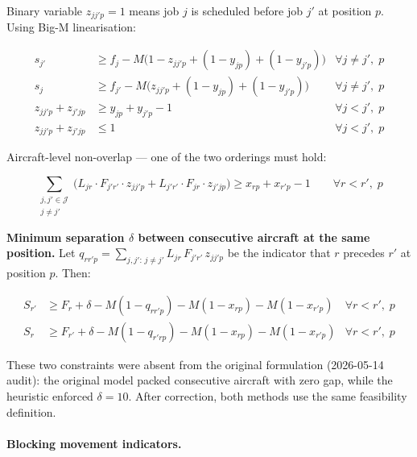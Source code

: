 Binary variable $z_{jj'p} = 1$ means job $j$ is scheduled before job $j'$ at
position $p$.  Using Big-M linearisation:

\begin{align}
    s_{j'} &\geq f_j - M\bigl(1 - z_{jj'p} + (1-y_{jp}) + (1-y_{j'p})\bigr)
        & \forall j \neq j',\; p
        \label{eq:non-overlap-1} \\
    s_j &\geq f_{j'} - M\bigl(z_{jj'p} + (1-y_{jp}) + (1-y_{j'p})\bigr)
        & \forall j \neq j',\; p
        \label{eq:non-overlap-2} \\
    z_{jj'p} + z_{j'jp} &\geq y_{jp} + y_{j'p} - 1
        & \forall j < j',\; p
        \label{eq:order-lb} \\
    z_{jj'p} + z_{j'jp} &\leq 1
        & \forall j < j',\; p
        \label{eq:order-ub}
\end{align}

Aircraft-level non-overlap — one of the two orderings must hold:

\begin{equation}
    \sum_{\substack{j,j'\in\mathcal{J} \\ j \neq j'}}
    \bigl(L_{jr} \cdot F_{j'r'} \cdot z_{jj'p}
          + L_{j'r'} \cdot F_{jr} \cdot z_{j'jp}\bigr)
    \geq x_{rp} + x_{r'p} - 1
    \qquad \forall r < r',\; p
    \label{eq:aircraft-order}
\end{equation}

\noindent\textbf{Minimum separation $\delta$ between consecutive aircraft at the same
position.}  Let $q_{rr'p} = \sum_{j,j':\,j\neq j'} L_{jr}\,F_{j'r'}\,z_{jj'p}$ be
the indicator that $r$ precedes $r'$ at position $p$.  Then:

\begin{align}
    S_{r'} &\geq F_r + \delta - M(1-q_{rr'p})
             - M(1-x_{rp}) - M(1-x_{r'p})
             & \forall r < r',\; p
             \label{eq:same-pos-delta-1} \\
    S_r    &\geq F_{r'} + \delta - M(1-q_{r'rp})
             - M(1-x_{rp}) - M(1-x_{r'p})
             & \forall r < r',\; p
             \label{eq:same-pos-delta-2}
\end{align}

\noindent These two constraints were absent from the original formulation
(2026-05-14 audit): the original model packed consecutive aircraft with zero
gap, while the heuristic enforced $\delta=10$.  After correction, both
methods use the same feasibility definition.

\paragraph{Blocking movement indicators.}

